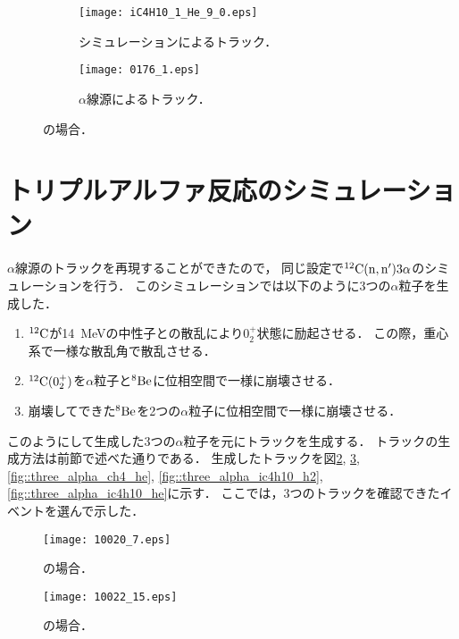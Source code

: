 \documentclass[../master]{subfiles}
\begin{document}
\begin{figure}
  \centering
  \begin{subfigure}{0.48\columnwidth}
    \centering
    \texttt{[image: iC4H10\_1\_He\_9\_0.eps]}
    \caption{シミュレーションによるトラック．}
  \end{subfigure}
  \begin{subfigure}{0.48\columnwidth}
    \centering
    \texttt{[image: 0176\_1.eps]}
    \caption{$\alpha$線源によるトラック．}
  \end{subfigure}
  \caption{\isoButaneHerium の場合．}
  \label{fig::track_comp_ic4h10_he}
\end{figure}

\section{トリプルアルファ反応のシミュレーション}
\label{sec::triple_alpha_simulation}
$\alpha$線源のトラックを再現することができたので，
同じ設定で${}^{12}{\rm C}({\rm n},{\rm n}')3\alpha$のシミュレーションを行う．
このシミュレーションでは以下のように3つの$\alpha$粒子を生成した．
\begin{enumerate}
\item
  ${}^{12}{\rm C}$が\SI{14}{\mega\electronvolt}の中性子との散乱により$0_2^+$状態に励起させる．
  この際，重心系で一様な散乱角で散乱させる．
\item
  ${}^{12}{\rm C} (0_2^+)$を$\alpha$粒子と${}^{8}{\rm Be}$に位相空間で一様に崩壊させる．
\item
  崩壊してできた${}^{8}{\rm Be}$を2つの$\alpha$粒子に位相空間で一様に崩壊させる．
\end{enumerate}
このようにして生成した3つの$\alpha$粒子を元にトラックを生成する．
トラックの生成方法は前節で述べた通りである．
生成したトラックを図\ref{fig::three_alpha_ch4}, \ref{fig::three_alpha_ch4_h2}, \ref{fig::three_alpha_ch4_he},
\ref{fig::three_alpha_ic4h10_h2}, \ref{fig::three_alpha_ic4h10_he}に示す．
ここでは，3つのトラックを確認できたイベントを選んで示した．
\begin{figure}
  \centering
  \texttt{[image: 10020\_7.eps]}
  \caption{\Methane の場合．}
  \label{fig::three_alpha_ch4}
\end{figure}

\begin{figure}
  \centering
  \texttt{[image: 10022\_15.eps]}
  \caption{\MethaneHydro の場合．}
  \label{fig::three_alpha_ch4_h2}
\end{figure}
\end{document}
